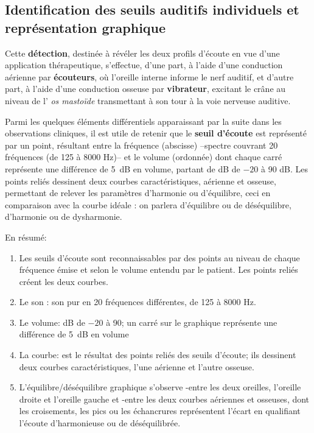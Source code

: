 \subsection{Identification des seuils auditifs individuels et représentation graphique}

Cette \textbf{détection}, destinée à révéler les deux profils d'écoute
en vue d'une application thérapeutique,
s'effectue, d'une part, à l'aide d'une
conduction aérienne par \textbf{écouteurs}, où l'oreille interne
informe le nerf auditif,  et d'autre part, à l'aide
d'une conduction osseuse par\textbf{ vibrateur}, excitant le crâne au
niveau de l'
\textit{os mastoïde} transmettant à son tour à  la voie nerveuse
auditive.

Parmi les quelques éléments différentiels
apparaissant par la suite dans les observations cliniques, il est utile de retenir
que le \textbf{seuil d'écoute} est représenté par un point, résultant entre la
fréquence (abscisse) --spectre couvrant 20
fréquences (de 125 à 8000 Hz)--   et le volume
(ordonnée) dont chaque carré représente une différence de \SI{5}{\dB} en
volume, partant de dB de $-20$ à 90 dB.
Les points reliés dessinent deux courbes caractéristiques, aérienne
et osseuse, permettant de relever les paramètres d'harmonie ou
          d'équilibre, ceci
 	en comparaison avec la courbe idéale : on parlera
        d'équilibre ou de
 	déséquilibre, d'harmonie ou de dysharmonie.
 	
 	
En résumé: 
        \begin{enumerate}

  \item   Les seuils d'écoute sont reconnaissables par des points au niveau de
          chaque fréquence émise et selon le volume entendu par le
          patient. Les points reliés créent les deux courbes.
 	\item Le son : son pur en 20 fréquences différentes, de 125 à 8000 Hz.
 	\item Le volume: dB de $-20$ à 90; un carré sur le graphique représente une différence de \SI{5}{\dB} en
 		volume
 	\item La courbe: est le résultat des points reliés des seuils
          d'écoute; ils
          dessinent deux courbes caractéristiques, l'une aérienne et l'autre osseuse.
\item L'équilibre/déséquilibre graphique s'observe
        -entre les deux oreilles, l'oreille droite et l'oreille gauche
        et
        -entre les deux courbes aériennes et osseuses, dont les
        croisements, les pics ou les échancrures représentent
        l'écart en
        qualifiant l'écoute d'harmonieuse ou de
        déséquilibrée.
      \end{enumerate}

